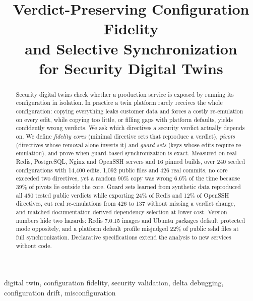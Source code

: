 \documentclass[conference]{IEEEtran}
\begin{document}
\title{Verdict-Preserving Configuration Fidelity\\ and Selective Synchronization\\ for Security Digital Twins}

\author{
}

\maketitle

\begin{abstract}
Security digital twins check whether a production service is exposed by running its configuration in isolation. In practice a twin platform rarely receives the whole configuration: copying everything leaks customer data and forces a costly re-emulation on every edit, while copying too little, or filling gaps with platform defaults, yields confidently wrong verdicts. We ask which directives a security verdict actually depends on. We define \emph{fidelity cores} (minimal directive sets that reproduce a verdict), \emph{pivots} (directives whose removal alone inverts it) and \emph{guard sets} (keys whose edits require re-emulation), and prove when guard-based synchronization is exact. Measured on real Redis, PostgreSQL, Nginx and OpenSSH servers and 16 pinned builds, over 240 seeded configurations with 14,400 edits, 1,092 public files and 426 real commits, no core exceeded two directives, yet a random 90\% copy was wrong 6.6\% of the time because 39\% of pivots lie outside the core. Guard sets learned from synthetic data reproduced all 450 tested public verdicts while exporting 24\% of Redis and 12\% of OpenSSH directives, cut real re-emulations from 426 to 137 without missing a verdict change, and matched documentation-derived dependency selection at lower cost. Version numbers hide two hazards: Redis 7.0.15 images and Ubuntu packages default protected mode oppositely, and a platform default profile misjudged 22\% of public sshd files at full synchronization. Declarative specifications extend the analysis to new services without code.
\end{abstract}

\begin{IEEEkeywords}
digital twin, configuration fidelity, security validation, delta debugging, configuration drift, misconfiguration
\end{IEEEkeywords}
\end{document}

